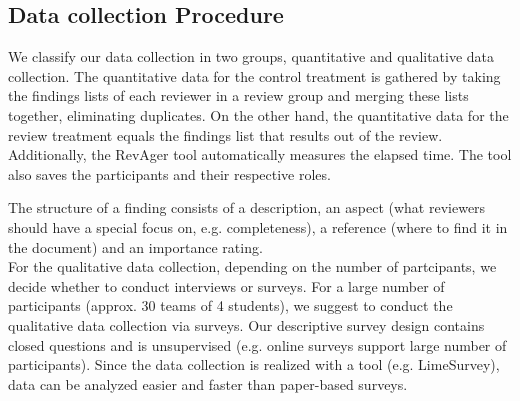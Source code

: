 \subsection{Data collection Procedure}

We classify our data collection in two groups, quantitative and qualitative data collection.
The quantitative data for the control treatment is gathered by taking the findings lists of each reviewer in a review group and merging these lists together, eliminating duplicates.
On the other hand, the quantitative data for the review treatment equals the findings list that results out of the review. Additionally, the RevAger tool automatically measures the elapsed time.
The tool also saves the participants and their respective roles.

The structure of a finding consists of a description, an aspect (what reviewers should have a special focus on, e.g. completeness), a reference (where to find it in the document) and an importance rating. \\

For the qualitative data collection, depending on the number of partcipants, we decide whether to conduct interviews or surveys. For a large number of participants (approx. 30 teams of 4 students), we suggest to conduct the qualitative data collection via surveys. Our descriptive survey design contains closed questions and is unsupervised (e.g. online surveys support large number of participants). Since the data collection is realized with a tool (e.g. LimeSurvey), data can be analyzed easier and faster than paper-based surveys.\\

